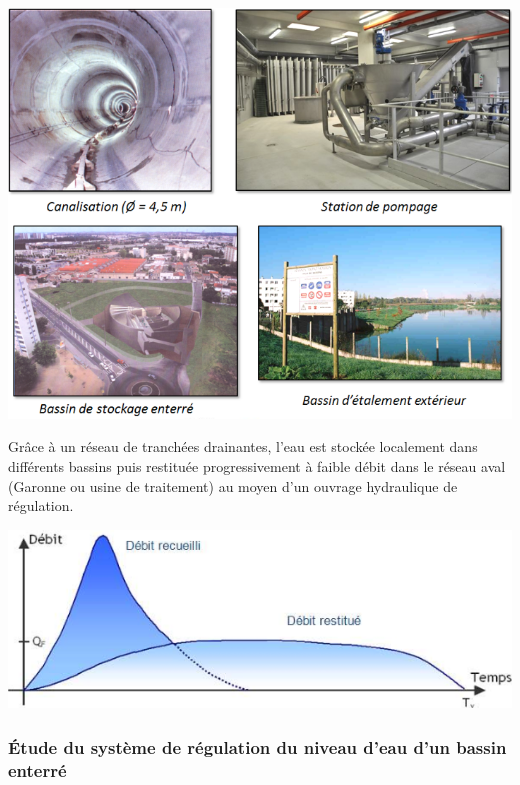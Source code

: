 \documentclass[10pt]{article}
\begin{document}
\begin{center}
\includegraphics[width=.8\textwidth]{images/img2}
\end{center}


\begin{minipage}[c]{.35\linewidth}

Grâce à un réseau de tranchées drainantes, l’eau est stockée localement dans différents bassins puis restituée progressivement à faible débit dans le réseau aval (Garonne ou usine de traitement) au moyen d’un ouvrage hydraulique de régulation.  

\end{minipage}\hfill
\begin{minipage}[c]{.62\linewidth}
\begin{center}
\includegraphics[width=.95\textwidth]{images/img3}
\end{center}
\end{minipage}


\subsubsection*{Étude du système de régulation du niveau d’eau d’un bassin enterré}
\end{document}
